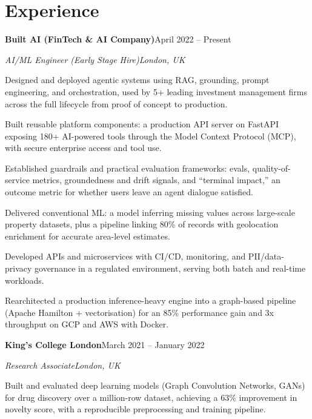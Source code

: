 \documentclass[10pt,a4paper]{article}
\newcommand{\entry}[4]{%
  {\color{company}\bfseries #1}\hfill {\color{muted}#2}\par
  \vspace{1pt}
  {\itshape #3}\hfill {\color{muted}\itshape #4}\par
  \vspace{3pt}%
}
\begin{document}
\section{Experience}
\entry{Built AI (FinTech \& AI Company)}{April 2022 -- Present}{AI/ML Engineer (Early Stage Hire)}{London, UK}
\begin{tight}
  \item Designed and deployed agentic systems using RAG, grounding, prompt engineering, and orchestration, used by 5+ leading investment management firms across the full lifecycle from proof of concept to production.
  \item Built reusable platform components: a production API server on FastAPI exposing 180+ AI-powered tools through the Model Context Protocol (MCP), with secure enterprise access and tool use.
  \item Established guardrails and practical evaluation frameworks: evals, quality-of-service metrics, groundedness and drift signals, and ``terminal impact,'' an outcome metric for whether users leave an agent dialogue satisfied.
  \item Delivered conventional ML: a model inferring missing values across large-scale property datasets, plus a pipeline linking 80\% of records with geolocation enrichment for accurate area-level estimates.
  \item Developed APIs and microservices with CI/CD, monitoring, and PII/data-privacy governance in a regulated environment, serving both batch and real-time workloads.
  \item Rearchitected a production inference-heavy engine into a graph-based pipeline (Apache Hamilton + vectorisation) for an 85\% performance gain and 3x throughput on GCP and AWS with Docker.
\end{tight}

\entry{King's College London}{March 2021 -- January 2022}{Research Associate}{London, UK}
\begin{tight}
  \item Built and evaluated deep learning models (Graph Convolution Networks, GANs) for drug discovery over a million-row dataset, achieving a 63\% improvement in novelty score, with a reproducible preprocessing and training pipeline.
\end{tight}

\end{document}
